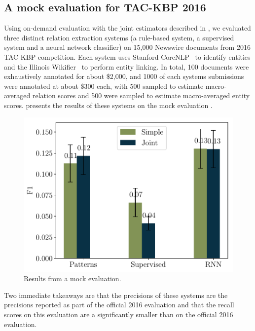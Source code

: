 \subsection{A mock evaluation for TAC-KBP 2016}
Using on-demand evaluation with the joint estimators described in , we evaluated three distinct relation extraction systems (a rule-based system, a supervised system and a neural network classifier) on 15,000 Newswire documents from 2016 TAC KBP competition.
Each system uses Stanford CoreNLP~\citep{} to identify entities and the Illinois Wikifier~\citep{} to perform entity linking. 
In total, 100 documents were exhaustively annotated for about \$2,000, and 1000 of each systems submissions were annotated at about \$300 each, with 500 sampled to estimate macro-averaged relation scores and 500 were sampled to estimate macro-averaged entity scores.
 presents the results of these systems on the mock evaluation .

\begin{figure}[t]
  \centering
  \includegraphics[width=\columnwidth]{figures/kbp2016/kbp2016_f1}
  \caption{\label{fig:evaluation-results} Results from a mock evaluation.}
\end{figure}

%  

Two immediate takeaways are that the precisions of these systems are  the precisions reported as part of the official 2016 evaluation and that the recall scores on this evaluation are a significantly smaller than on the official 2016 evaluation.
